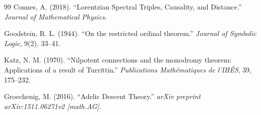 \begin{thebibliography}{99}
Connes, A. (2018).
``Lorentzian Spectral Triples, Causality, and Distance.''
\textit{Journal of Mathematical Physics}.

Goodstein, R. L. (1944).
``On the restricted ordinal theorem.''
\textit{Journal of Symbolic Logic}, 9(2), 33--41.

Katz, N. M. (1970).
``Nilpotent connections and the monodromy theorem: Applications of a result of Turrittin.''
\textit{Publications Mathématiques de l'IHÉS}, 39, 175--232.

Groechenig, M. (2016).
``Adelic Descent Theory.''
\textit{arXiv preprint arXiv:1511.06271v2 [math.AG]}.

\end{thebibliography}

